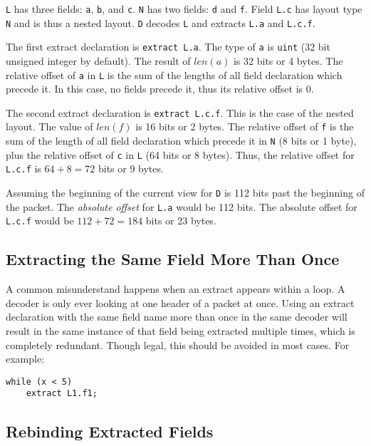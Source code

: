 \texttt{L} has three fields: \texttt{a}, \texttt{b}, and \texttt{c}.  \texttt{N} has two fields: \texttt{d} and \texttt{f}. Field \texttt{L.c} has layout type \texttt{N} and is thus a nested layout. \texttt{D} decodes \texttt{L} and extracts \texttt{L.a} and \texttt{L.c.f}.

The first extract declaration is \texttt{extract L.a}. The type of \texttt{a} is \texttt{uint} (32 bit unsigned integer by default). The result of $len(a)$ is 32 bits or 4 bytes. The relative offset of \texttt{a} in \texttt{L} is the sum of the lengths of all field declaration which precede it. In this case, no fields precede it, thus its relative offset is 0.

The second extract declaration is \texttt{extract L.c.f}. This is the case of the nested layout. The value of $len(f)$ is 16 bits or 2 bytes. The relative offset of \texttt{f} is the sum of the length of all field declaration which precede it in \texttt{N} (8 bits or 1 byte), plus the relative offset of \texttt{c} in \texttt{L} (64 bits or 8 bytes). Thus, the relative offset for \texttt{L.c.f} is $64+8=72$ bits or 9 bytes.

Assuming the beginning of the current view for \texttt{D} is 112 bits past the beginning of the packet. The \textit{absolute offset} for \texttt{L.a} would be 112 bits. The absolute offset for \texttt{L.c.f} would be $112+72=184$ bits or 23 bytes.

\subsection{Extracting the Same Field More Than Once}

A common misunderstand happens when an extract appears within a loop.
A decoder is only ever looking at one header of a packet at once. Using an extract declaration with the same field name more than once in the same decoder will result in the same instance of that field being extracted multiple times, which is completely redundant. Though legal, this should be avoided in most cases. For example: 

\begin{minip}
\begin{lstlisting}
while (x < 5)
	extract L1.f1;
\end{lstlisting}
\end{minip}

\subsection{Rebinding Extracted Fields}

